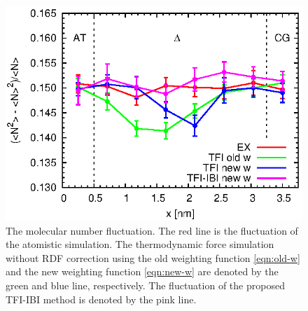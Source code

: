 \documentclass[aps,pre,preprint,unsortedaddress]{revtex4}
\begin{document}


\begin{figure}
  \centering
  \includegraphics[]{fig.3/count.eps}
  \caption{
    The molecular number fluctuation.
    The red line is the fluctuation of the atomistic
    simulation. The thermodynamic force simulation without RDF
    correction using the old weighting function \eqref{eqn:old-w} and
    the new weighting function \eqref{eqn:new-w} are denoted by the
    green and blue line, respectively. The fluctuation of the proposed TFI-IBI
    method is denoted by the pink line.  }
\end{figure}
\end{document}
